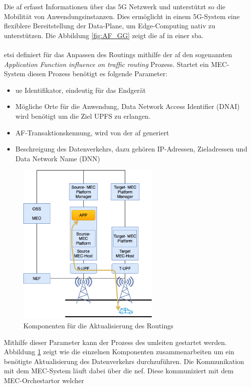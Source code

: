 \documentclass[runningheads]{llncs}
\numberwithin{figure}{section}
\begin{document}
Die \acrfull{af} erfasst Informationen über das 5G Netzwerk und unterstützt so die Mobilität von Anwendungsinstanzen. 
Dies ermöglicht in einem 5G-System eine flexiblere Bereitstellung der Data-Plane, um Edge-Computing nativ zu unterstützen.
Die Abbildung \ref{fig:AF_GG} zeigt die \acrshort{af} in einer \acrlong{sba}.
\\
\\
\acrshort{etsi} definiert für das Anpassen des Routings mithilfe der \acrshort{af} den sogenannten \textit{Application Function influence on traffic routing} Prozess.
Startet ein MEC-System diesen Prozess benötigt es folgende Parameter:
\begin{itemize}
  \item \acrshort{ue} Identifikator, eindeutig für das Endgerät
  \item Mögliche Orte für die Anwendung, Data Network Access Identifier (DNAI) wird benötigt um die Ziel UPFS zu erlangen.
  \item AF-Transaktionskennung, wird von der \acrshort{af} generiert
  \item Beschreigung des Datenverkehrs, dazu gehören IP-Adressen, Zieladressen und Data Network Name (DNN)
\end{itemize}
\begin{figure}
  \centering
  \includegraphics[width=7cm]{images/Datenverkehr_Update.png}
  \caption{Komponenten für die Aktualisierung des Routings}
  \label{fig:Datenverkehr_Update}
\end{figure}
Mithilfe dieser Parameter kann der Prozess des umleiten gestartet werden.
Abbildung \ref{fig:Datenverkehr_Update} zeigt wie die einzelnen Komponenten zusammenarbeiten um ein benötigte Aktualisierung des Datenverkehrs durchzuführen.
Die Kommunikation mit dem MEC-System läuft dabei über die \acrshort{nef}. Diese kommuniziert mit dem MEC-Orchestartor welcher
\end{document}
